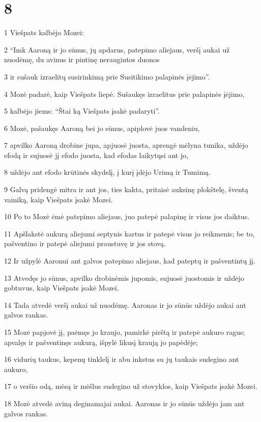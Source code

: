 \chapter{8}


\par 1 Viešpats kalbėjo Mozei: 
\par 2 “Imk Aaroną ir jo sūnus, jų apdarus, patepimo aliejaus, veršį aukai už nuodėmę, du avinus ir pintinę neraugintos duonos 
\par 3 ir sušauk izraelitų susirinkimą prie Susitikimo palapinės įėjimo”. 
\par 4 Mozė padarė, kaip Viešpats liepė. Sušaukęs izraelitus prie palapinės įėjimo, 
\par 5 kalbėjo jiems: “Štai ką Viešpats įsakė padaryti”. 
\par 6 Mozė, pašaukęs Aaroną bei jo sūnus, apiplovė juos vandeniu, 
\par 7 apvilko Aaroną drobine jupa, apjuosė juosta, aprengė mėlyna tunika, uždėjo efodą ir sujuosė jį efodo juosta, kad efodas laikytųsi ant jo, 
\par 8 uždėjo ant efodo krūtinės skydelį, į kurį įdėjo Urimą ir Tumimą. 
\par 9 Galvą pridengė mitra ir ant jos, ties kakta, pritaisė auksinę plokštelę, šventą vainiką, kaip Viešpats įsakė Mozei. 
\par 10 Po to Mozė ėmė patepimo aliejaus, juo patepė palapinę ir visus jos daiktus. 
\par 11 Apšlakstė aukurą aliejumi septynis kartus ir patepė visus jo reikmenis; be to, pašventino ir patepė aliejumi praustuvę ir jos stovą. 
\par 12 Ir užpylė Aaronui ant galvos patepimo aliejaus, kad pateptų ir pašventintų jį. 
\par 13 Atvedęs jo sūnus, apvilko drobinėmis jupomis, sujuosė juostomis ir uždėjo gobtuvus, kaip Viešpats įsakė Mozei. 
\par 14 Tada atvedė veršį aukai už nuodėmę. Aaronas ir jo sūnūs uždėjo aukai ant galvos rankas. 
\par 15 Mozė papjovė jį, paėmęs jo kraujo, pamirkė pirštą ir patepė aukuro ragus; apvalęs ir pašventinęs aukurą, išpylė likusį kraują jo papėdėje; 
\par 16 vidurių taukus, kepenų tinklelį ir abu inkstus su jų taukais sudegino ant aukuro, 
\par 17 o veršio odą, mėsą ir mėšlus sudegino už stovyklos, kaip Viešpats įsakė Mozei. 
\par 18 Mozė atvedė aviną deginamajai aukai. Aaronas ir jo sūnūs uždėjo jam ant galvos rankas. 
